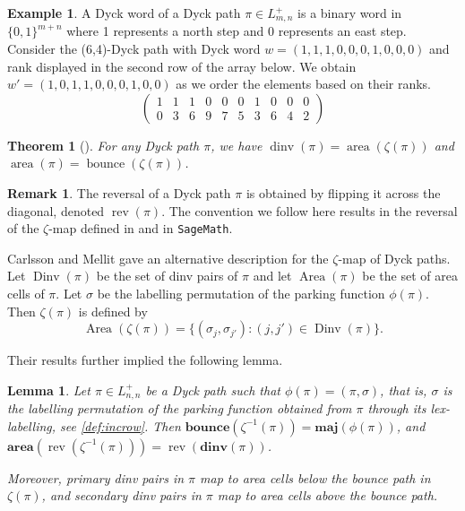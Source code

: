 \documentclass[12pt,reqno]{amsart}
\newtheorem{thm}{Theorem}
\newtheorem{lem}{Lemma}
\theoremstyle{definition}
\newtheorem{example}{Example}
\newtheorem{remark}{Remark}
\newcommand{\aarea}{\mathbf{area}}
\newcommand{\ddinv}{\mathbf{dinv}}
\newcommand{\maj}{\mathbf{maj}}
\newcommand{\bbounce}{\mathbf{bounce}}
\DeclareMathOperator{\area}{area}
\DeclareMathOperator{\dinv}{dinv}
\DeclareMathOperator{\Area}{Area}
\DeclareMathOperator{\Dinv}{Dinv}
\DeclareMathOperator{\bounce}{bounce}
\DeclareMathOperator{\rev}{rev}
\begin{document}
\begin{example}
A Dyck word of a Dyck path $\pi \in L_{m,n}^+$ is a binary word in $\{0,1\}^{m+n}$ where 1 represents a north step and 0 represents an east step.
Consider the (6,4)-Dyck path with Dyck word $w = (1,1,1,0,0,0,1,0,0,0)$ and rank displayed in the second row of the array below.
We obtain $w' = (1,0,1,1,0,0,0,1,0,0)$ as we order the elements based on their ranks.
\[
  \begin{pmatrix}
  1 & 1 & 1 & 0 & 0 & 0 & 1 & 0 & 0 & 0 \\
  0 & 3 & 6 & 9 & 7 & 5 & 3 & 6 & 4 & 2
  \end{pmatrix}
\]
\end{example}

\begin{thm}[\cite{MR1972636,MR2163448,ThomasWilliams2018}]
For any Dyck path $\pi$, we have $\dinv(\pi) = \area(\zeta(\pi))$ and $\area(\pi) = \bounce(\zeta(\pi))$.
\end{thm}

\begin{remark}
The reversal of a Dyck path $\pi$ is obtained by flipping it across the diagonal, denoted $\rev(\pi)$. The convention we follow here results in the reversal of the $\zeta$-map defined in \cite{MR2371044} and in \texttt{SageMath}.
\end{remark}

Carlsson and Mellit gave an alternative description for the $\zeta$-map of Dyck paths.
Let $\Dinv(\pi)$ be the set of dinv pairs of $\pi$ and let $\Area(\pi)$ be the set of area cells of $\pi$.
Let $\sigma$ be the labelling permutation of the parking function $\phi(\pi)$.
Then $\zeta(\pi)$ is defined by 
\begin{equation}
  \Area(\zeta(\pi)) = \{(\sigma_j,\sigma_{j'}): (j,j') \in \Dinv(\pi)\}.
\end{equation}

Their results further implied the following lemma.
\begin{lem}\label{prop:vector_zeta}
Let $\pi \in L_{n,n}^+$ be a Dyck path such that $\phi(\pi) = (\pi,\sigma)$, that is, $\sigma$ is the labelling permutation of the parking function obtained from $\pi$ through its lex-labelling, see \cref{def:incrow}. Then $\bbounce(\zeta^{-1}(\pi)) = \maj(\phi(\pi))$, and $\aarea(\rev(\zeta^{-1}(\pi))) = \rev(\ddinv(\pi))$. 

Moreover, primary dinv pairs in $\pi$ map to area cells below the bounce path in $\zeta(\pi)$, and secondary dinv pairs in $\pi$ map to area cells above the bounce path.
\end{lem}
\end{document}
